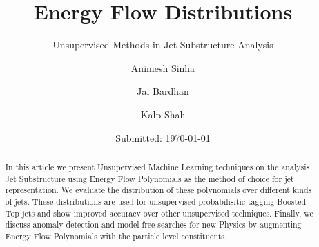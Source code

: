 \documentclass[smallextended]{template/svjour3}       %
\begin{document}
\title{Energy Flow Distributions%
}
\subtitle{Unsupervised Methods in Jet Substructure Analysis}

\author{Animesh Sinha \and Jai Bardhan \and Kalp Shah}



\date{Submitted: \today}

\maketitle

\begin{abstract}
  In this article we present Unsupervised Machine Learning techniques on the analysis Jet Substructure using Energy Flow Polynomials as the method of choice for jet representation. We evaluate the distribution of these polynomials over different kinds of jets. These distributions are used for unsupervised probabilisitic tagging Boosted Top jets and show improved accuracy over other unsupervised techniques. Finally, we discuss anomaly detection and model-free searches for new Physics by augmenting Energy Flow Polynomials with the particle level constituents.
\end{abstract}








\end{document}
